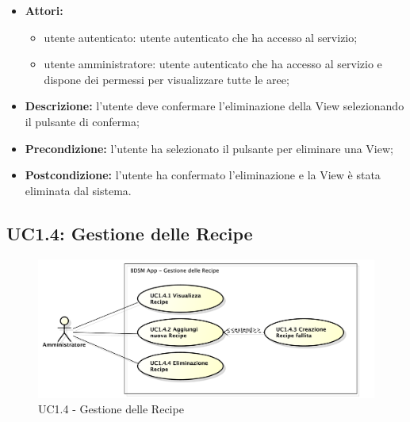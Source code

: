 \begin{itemize}
   	\item \textbf{Attori:}
    \begin{itemize}
    	\item utente autenticato: utente autenticato che ha accesso al servizio;
    	\item utente amministratore: utente autenticato che ha accesso al servizio e dispone dei permessi per visualizzare tutte le aree;
	\end{itemize}
    \item \textbf{Descrizione:} l'utente deve confermare l'eliminazione della View selezionando il pulsante di conferma;
    \item \textbf{Precondizione:} l'utente ha selezionato il pulsante per eliminare una View;
    \item \textbf{Postcondizione:} l'utente ha confermato l'eliminazione e la View è stata eliminata dal sistema.
\end{itemize}

\pagebreak


\subsection{UC1.4: Gestione delle Recipe}

\begin{figure}[!ht]
    \centering
    \centerline{\includegraphics[scale=0.5]{./images/UC1_4.pdf}}
    \caption{UC1.4 - Gestione delle Recipe}
\end{figure}

